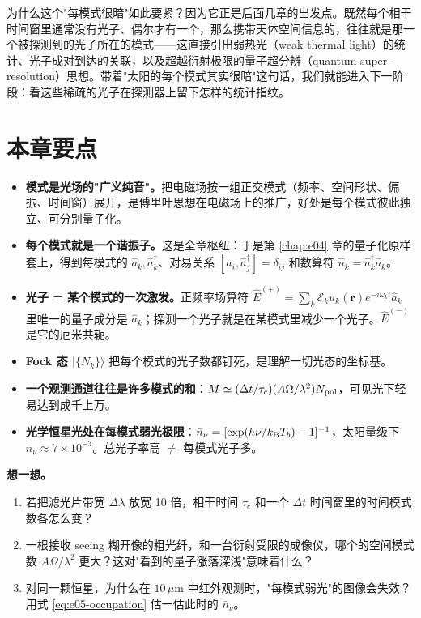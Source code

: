 为什么这个"每模式很暗"如此要紧？因为它正是后面几章的出发点。既然每个相干时间窗里通常没有光子、偶尔才有一个，那么携带天体空间信息的，往往就是那一个被探测到的光子所在的模式——这直接引出弱热光（weak thermal light）的统计、光子成对到达的关联，以及超越衍射极限的量子超分辨（quantum super-resolution）思想。带着"太阳的每个模式其实很暗"这句话，我们就能进入下一阶段：看这些稀疏的光子在探测器上留下怎样的统计指纹。

\section{本章要点}
\label{sec:e05-summary}

\begin{itemize}
  \item \textbf{模式是光场的"广义纯音"。}把电磁场按一组正交模式（频率、空间形状、偏振、时间窗）展开，是傅里叶思想在电磁场上的推广，好处是每个模式彼此独立、可分别量子化。
  \item \textbf{每个模式就是一个谐振子。}这是全章枢纽：于是第 \ref{chap:e04} 章的量子化原样套上，得到每模式的 \(\hat a_k,\hat a_k^\dagger\)、对易关系 \([\hat a_i,\hat a_j^\dagger]=\delta_{ij}\) 和数算符 \(\hat n_k=\hat a_k^\dagger\hat a_k\)。
  \item \textbf{光子 = 某个模式的一次激发。}正频率场算符 \(\hat E^{(+)}=\sum_k\mathcal E_k u_k(\bm r)e^{-i\omega_k t}\hat a_k\) 里唯一的量子成分是 \(\hat a_k\)；探测一个光子就是在某模式里减少一个光子。\(\hat E^{(-)}\) 是它的厄米共轭。
  \item \textbf{Fock 态 \(|\{N_k\}\rangle\)} 把每个模式的光子数都钉死，是理解一切光态的坐标基。
  \item \textbf{一个观测通道往往是许多模式的和}：\(M\simeq(\Delta t/\tau_c)(A\Omega/\lambda^2)N_{\rm pol}\)，可见光下轻易达到成千上万。
  \item \textbf{光学恒星光处在每模式弱光极限}：\(\bar n_\nu=[\exp(h\nu/k_{\rm B}T_b)-1]^{-1}\)，太阳量级下 \(\bar n_\nu\approx7\times10^{-3}\)。总光子率高 \(\neq\) 每模式光子多。
\end{itemize}

\medskip
\noindent\textbf{想一想。}
\begin{enumerate}
  \item 若把滤光片带宽 \(\Delta\lambda\) 放宽 10 倍，相干时间 \(\tau_c\) 和一个 \(\Delta t\) 时间窗里的时间模式数各怎么变？
  \item 一根接收 seeing 糊开像的粗光纤，和一台衍射受限的成像仪，哪个的空间模式数 \(A\Omega/\lambda^2\) 更大？这对"看到的量子涨落深浅"意味着什么？
  \item 对同一颗恒星，为什么在 \(10\,\mu\mathrm{m}\) 中红外观测时，"每模式弱光"的图像会失效？用式 \eqref{eq:e05-occupation} 估一估此时的 \(\bar n_\nu\)。
\end{enumerate}
